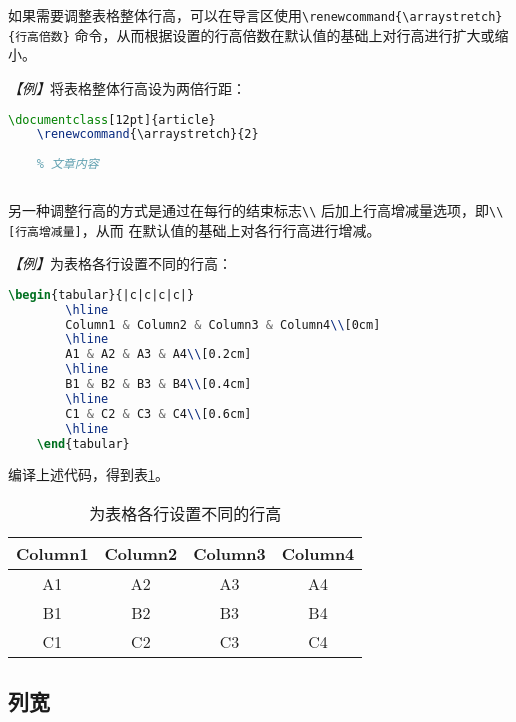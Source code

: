 如果需要调整表格整体行高，可以在导言区使用\texttt{\textbackslash{}renewcommand\{\textbackslash{}arraystretch\}\{行高倍数\}}
命令，从而根据设置的行高倍数在默认值的基础上对行高进行扩大或缩小。

\emph{【例】}将表格整体行高设为两倍行距：
\begin{lstlisting}[language=TeX]
    \documentclass[12pt]{article}
    \renewcommand{\arraystretch}{2}
    
    % 文章内容
    
\end{lstlisting}

另一种调整行高的方式是通过在每行的结束标志\texttt{\textbackslash{}\textbackslash{}}
后加上行高增减量选项，即\texttt{\textbackslash{}\textbackslash{}[行高增减量]}，从而
在默认值的基础上对各行行高进行增减。

\emph{【例】}为表格各行设置不同的行高：
\begin{lstlisting}[language=TeX]
    \begin{tabular}{|c|c|c|c|}
        \hline
        Column1 & Column2 & Column3 & Column4\\[0cm]
        \hline
        A1 & A2 & A3 & A4\\[0.2cm]
        \hline
        B1 & B2 & B3 & B4\\[0.4cm]
        \hline
        C1 & C2 & C3 & C4\\[0.6cm]
        \hline
    \end{tabular}
\end{lstlisting}

编译上述代码，得到表\ref{tb16}。

\begin{table}[h]
    \centering
    \begin{tabular}{|c|c|c|c|}
        \hline
        Column1 & Column2 & Column3 & Column4 \\[0cm]
        \hline
        A1      & A2      & A3      & A4      \\[0.2cm]
        \hline
        B1      & B2      & B3      & B4      \\[0.4cm]
        \hline
        C1      & C2      & C3      & C4      \\[0.6cm]
        \hline
    \end{tabular}
    \caption{为表格各行设置不同的行高}
    \label{tb16}
\end{table}

\subsection{列宽}

